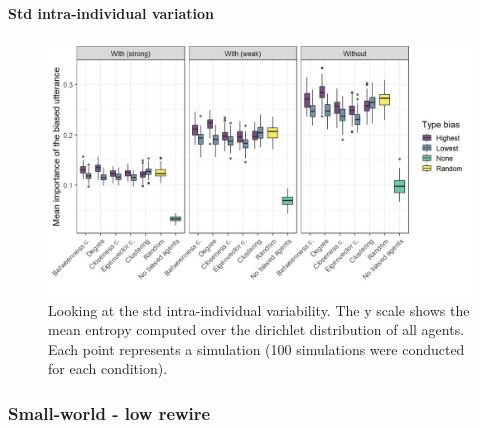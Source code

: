 \documentclass[
]{article}
\begin{document}
\hypertarget{std-intra-individual-variation-2}{%
\paragraph{Std intra-individual
variation}\label{std-intra-individual-variation-2}}

\begin{figure}[!H]

{\centering \includegraphics{./Figures/unnamed-chunk-208-1} 

}

\caption{Looking at the std intra-individual variability. The y scale shows the mean entropy computed over the dirichlet distribution of all agents. Each point represents a simulation (100 simulations were conducted for each condition).}\label{fig:unnamed-chunk-208}
\end{figure}

\hypertarget{small-world---low-rewire}{%
\subsubsection{Small-world - low
rewire}\label{small-world---low-rewire}}
\end{document}

